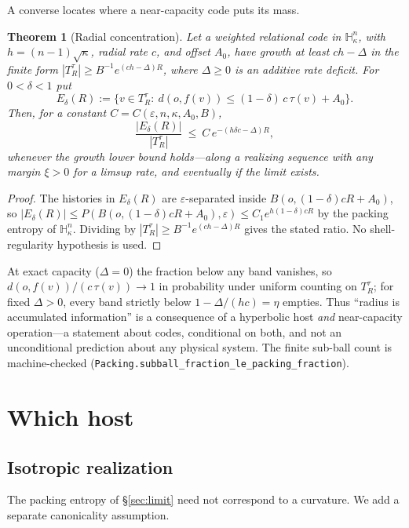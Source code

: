 \documentclass[11pt,reqno]{amsart}
\theoremstyle{plain}
\newtheorem{theorem}{Theorem}[section]
\theoremstyle{definition}
\newcommand{\Hk}{\mathbb{H}^n_\kappa}
\newcommand{\eps}{\varepsilon}
\begin{document}
A converse locates where a near-capacity code puts its mass.

\begin{theorem}[Radial concentration]\label{thm:radial}
Let a weighted relational code in $\Hk$, with $h=(n-1)\sqrt\kappa$, radial rate $c$, and offset $A_0$, have growth at least $ch-\Delta$ in the finite form $|T_R^\tau|\ge B^{-1}e^{(ch-\Delta)R}$, where $\Delta\ge0$ is an additive rate deficit. For $0<\delta<1$ put
\[
E_\delta(R):=\{v\in T_R^\tau:\ d(o,f(v))\le(1-\delta)\,c\,\tau(v)+A_0\}.
\]
Then, for a constant $C=C(\eps,n,\kappa,A_0,B)$,
\[
\frac{|E_\delta(R)|}{|T_R^\tau|}\ \le\ C\,e^{-(h\delta c-\Delta)R},
\]
whenever the growth lower bound holds---along a realizing sequence with any margin $\xi>0$ for a limsup rate, and eventually if the limit exists.
\end{theorem}

\begin{proof}
The histories in $E_\delta(R)$ are $\eps$-separated inside $B(o,(1-\delta)cR+A_0)$, so $|E_\delta(R)|\le P(B(o,(1-\delta)cR+A_0),\eps)\le C_1 e^{h(1-\delta)cR}$ by the packing entropy of $\Hk$. Dividing by $|T_R^\tau|\ge B^{-1}e^{(ch-\Delta)R}$ gives the stated ratio. No shell-regularity hypothesis is used.
\end{proof}

At exact capacity ($\Delta=0$) the fraction below any band vanishes, so $d(o,f(v))/(c\,\tau(v))\to1$ in probability under uniform counting on $T_R^\tau$; for fixed $\Delta>0$, every band strictly below $1-\Delta/(hc)=\eta$ empties. Thus ``radius is accumulated information'' is a consequence of a hyperbolic host \emph{and} near-capacity operation---a statement about codes, conditional on both, and not an unconditional prediction about any physical system. The finite sub-ball count is machine-checked (\texttt{Packing.subball\_fraction\_le\_packing\_fraction}).

\section{Which host}\label{sec:chart}

\subsection{Isotropic realization}

The packing entropy of \S\ref{sec:limit} need not correspond to a curvature. We add a separate canonicality assumption.
\end{document}
